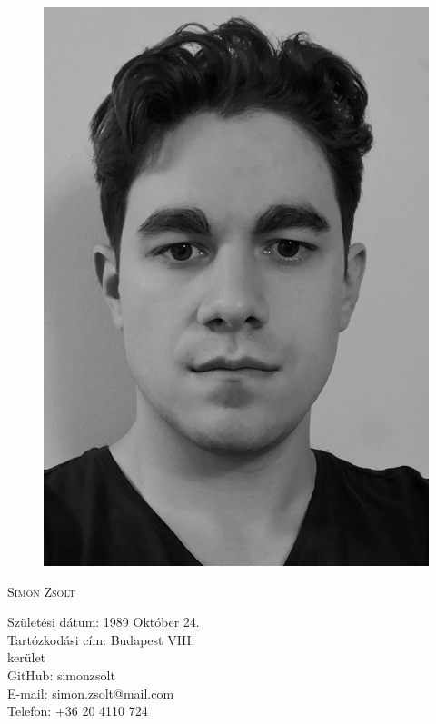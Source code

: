 

\setlength{\parindent}{0em}

\def \leftHeader{CV}
\def \rightHeader{Simon Zsolt}

\setmainfont[Mapping=tex-text,Numbers=OldStyle,Ligatures=TeX]{TeX Gyre Termes}



\begin{figure}
  \flushright
  \includegraphics[scale=0.4]{portrait_mono} 
\end{figure}

\begin{Large}
  \textsc{Simon Zsolt}
  \vspace{1em}
\end{Large}

Születési dátum: 1989 Október 24.\\
Tartózkodási cím: Budapest VIII.\\ \hspace*{1em} kerület\\ 
GitHub: simonzsolt\\
E-mail: simon.zsolt@mail.com\\
Telefon: +36 20 4110 724

